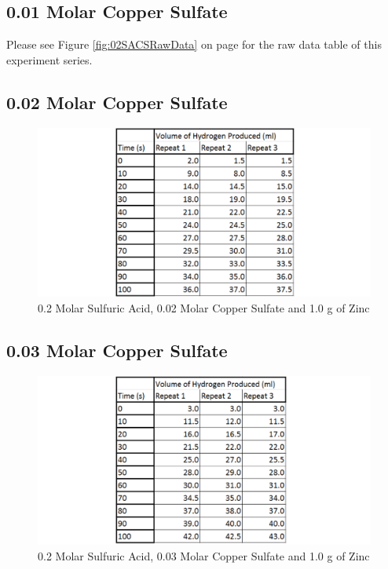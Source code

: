 	\subsection{0.01 Molar Copper Sulfate}

Please see Figure \ref{fig:02SACSRawData} on page \pageref{fig:02SACSRawData} for the raw data table of this experiment series.



	\subsection{0.02 Molar Copper Sulfate}

\begin{figure}[H]
    \includegraphics[width=\textwidth]{./Experiment/Images/3ChangeCatalyst/002Molar.pdf}
    \caption{0.2 Molar Sulfuric Acid, 0.02 Molar Copper Sulfate and 1.0 g of Zinc} \label{fig:002MolarCSRawData}
\end{figure}

	\subsection{0.03 Molar Copper Sulfate}

\begin{figure}[H]
    \includegraphics[width=\textwidth]{./Experiment/Images/3ChangeCatalyst/003Molar.pdf}
    \caption{0.2 Molar Sulfuric Acid, 0.03 Molar Copper Sulfate and 1.0 g of Zinc} \label{fig:003MolarCSRawData}
\end{figure}

